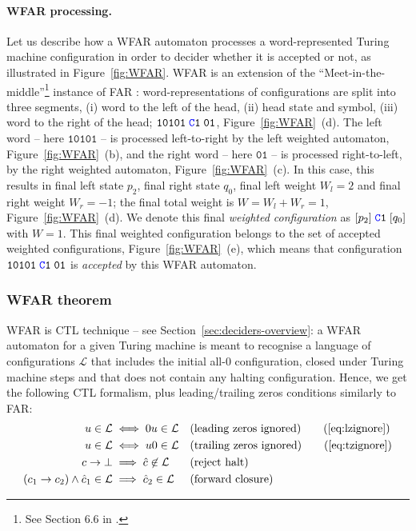 \paragraph{WFAR processing.} Let us describe how a WFAR automaton processes a word-represented Turing machine configuration in order to decider whether it is accepted or not, as illustrated in Figure~\ref{fig:WFAR}. WFAR is an extension of the ``Meet-in-the-middle''\footnote{See Section 6.6 in \cite{bbchallenge_part1}.} instance of FAR \cite{bbchallenge_part1}: word-representations of configurations are split into three segments, (i) word to the left of the head, (ii) head state and symbol, (iii) word to the right of the head; \eg $\texttt{10101}\; \texttt{\stateC}\sone\; \texttt{01}$, Figure~\ref{fig:WFAR}~(d). The left word -- here $\texttt{10101}$ -- is processed left-to-right by the left weighted automaton, Figure~\ref{fig:WFAR}~(b), and the right word -- here $\texttt{01}$ -- is processed right-to-left, by the right weighted automaton, Figure~\ref{fig:WFAR}~(c). In this case, this results in final left state $p_2$, final right state $q_0$, final left weight $W_l = 2$ and final right weight $W_r = -1$; the final total weight is $W = W_l + W_r = 1$, Figure~\ref{fig:WFAR}~(d). We denote this final \textit{weighted configuration} as $[p_2]\; \texttt{\stateC}\sone\; [q_0]$ with $W=1$. This final weighted configuration belongs to the set of accepted weighted configurations, Figure~\ref{fig:WFAR}~(e), which means that configuration $\texttt{10101}\; \texttt{\stateC}\sone\; \texttt{01}$ is \textit{accepted} by this WFAR automaton.


\subsubsection{WFAR theorem}

WFAR is CTL technique -- see Section~\ref{sec:deciders-overview}: a WFAR automaton for a given Turing machine is meant to recognise a language of configurations $\mathcal{L}$ that includes the initial all-0 configuration, closed under Turing machine steps and that does not contain any halting configuration. Hence, we get the following CTL formalism, plus leading/trailing zeros conditions similarly to FAR:
\begin{align}
    u \in \mathcal{L}                               & \iff 0u \in \mathcal{L}               &  & \text{(leading zeros ignored)}
    \tag{\ref{eq:lzignore}}
    \\
    u \in \mathcal{L}                               & \iff u0 \in \mathcal{L}               &  & \text{(trailing zeros ignored)}
    \tag{\ref{eq:tzignore}}
    \\
    c\TMstep\bot                                    & \implies \hat{c} \not \in \mathcal{L} &  & \text{(reject halt)} \label{eq:rejecthalt}     \\
    (c_1\TMstep c_2)\land \hat{c}_1 \in \mathcal{L} & \implies\hat{c}_2 \in \mathcal{L}     &  & \text{(forward closure)} \label{eq:forwardclo}
\end{align}

